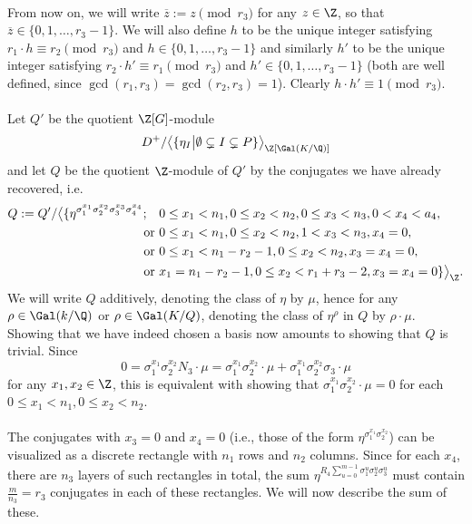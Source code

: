 \paragraph*{}
From now on, we will write $\overline{z}:=z\pmod{r_3}$ for any $z\in\Z$, so that $\overline{z}\in\{0,1,\dots,r_3-1\}$.
We will also define $h$ to be the unique integer satisfying $ r_1\cdot h\equiv r_2\pmod{r_3}$ and $h\in\{0,1,\dots,r_3-1\}$ and similarly $h'$ to be the unique integer satisfying $ r_2\cdot h'\equiv r_1\pmod{r_3}$ and $h'\in\{0,1,\dots,r_3-1\}$ (both are well defined, since $\gcd(r_1,r_3)=\gcd(r_2,r_3)=1$). Clearly $h\cdot h'\equiv 1 \pmod{r_3}$.

\paragraph*{}
Let $Q'$ be the quotient $\Z[G]$-module $$D^+/\big\langle \{\eta_I \big\vert \emptyset \subsetneq I \subsetneq P \}\big\rangle_{\Z[\Gal(K/\Q)]}$$
and let $Q$ be the quotient $\Z$-module of $Q'$ by the conjugates we have already recovered, i.e.
\begin{align*}
Q:=Q'/\big\langle \{\eta^{\sigma_1^{x_1}\sigma_2^{x_2}\sigma_3^{x_3}\sigma_4^{x_4}}; \quad & 0\leq x_1< n_1, 0\leq x_2<n_2, 0\leq x_3<n_3,0< x_4<a_4,\\
\text { or }& 0\leq x_1< n_1, 0\leq x_2<n_2, 1< x_3<n_3,x_4=0,\\
\text { or }& 0\leq x_1< n_1-r_2-1, 0\leq x_2<n_2, x_3=x_4=0,\\
\text { or }& x_1= n_1-r_2-1, 0\leq x_2<r_1+r_3-2, x_3=x_4=0 \}\big\rangle_{\Z}.
\end{align*}
We will write $Q$ additively, denoting the class of $\eta$ by $\mu$, hence for any $\rho\in\Gal(k/\Q)$ or $\rho\in \Gal(K/Q)$, denoting the class of $\eta^{\rho}$ in $Q$ by $\rho\cdot \mu$.
Showing that we have indeed chosen a basis now amounts to showing that $Q$ is trivial. Since $$0=\sigma_1^{x_1}\sigma_2^{x_2}N_3\cdot \mu=\sigma_1^{x_1}\sigma_2^{x_2}\cdot \mu+\sigma_1^{x_1}\sigma_2^{x_2}\sigma_3\cdot \mu$$
for any $x_1,x_2\in\Z$,
this is equivalent with showing that $\sigma_1^{x_1}\sigma_2^{x_2}\cdot \mu=0$ for each $0\leq x_1<n_1, 0\leq x_2<n_2$.

\paragraph*{}
The conjugates with $x_3=0$ and $x_4=0$ (i.e., those of the form $\eta^{\sigma_1^{x_1}\sigma_2^{x_2}}$) can be visualized as a discrete rectangle with $n_1$ rows and $n_2$ columns. Since for each $x_4$, there are $n_3$ layers of such rectangles in total, the sum $\eta^{R_4\sum_{u=0}^{m-1}\sigma_1^{u}\sigma_2^{u}\sigma_3^{u}}$ must contain $\frac{m}{n_3}=r_3$ conjugates in each of these rectangles. We will now describe the sum of these. 

